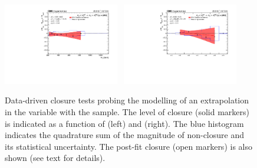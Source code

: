 \begin{figure}[h!]
  \begin{center}
    \includegraphics[width=0.45\textwidth]{figures/closureTests/AlphaT/DoubleMu_alphaTExtrapolation_ht.pdf}~
    \includegraphics[width=0.45\textwidth]{figures/closureTests/AlphaT/DoubleMu_alphaTExtrapolation_nJet.pdf}\\
    \caption{Data-driven closure tests probing the modelling of an
      extrapolation in the \alphat variable with the \mmj sample. The
      level of closure (solid markers) is indicated as a function of
      \scalht (left) and \njet (right). The blue histogram indicates
      the quadrature sum of the magnitude of non-closure and its
      statistical uncertainty. The post-fit closure (open markers) is
      also shown (see text for details).  }
    \label{fig:closure_AlphaT_mumu}
  \end{center} 
\end{figure}


